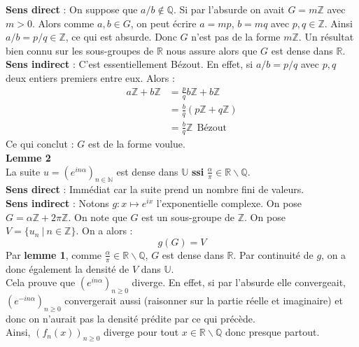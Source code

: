 \documentclass[a4paper,12pt]{article}
\begin{document}
\textbf{Sens direct} : On suppose que $a/b \notin \mathbb{Q}$. Si par l'absurde on avait $G=m \mathbb{Z}$ avec $m>0$. Alors comme $a,b \in G$, on peut écrire $a=mp$, $b=mq$ avec $p, q \in \mathbb{Z}$. Ainsi $a/b=p/q \in \mathbb{Z}$, ce qui est absurde. Donc $G$ n'est pas de la forme $m \mathbb{Z}$. Un résultat bien connu sur les sous-groupes de $\mathbb{R}$ nous assure alors que $G$ est dense dans $\mathbb{R}$. \\

\textbf{Sens indirect} : C'est essentiellement Bézout. En effet, si $a/b=p/q$ avec $p, q$ deux entiers premiers entre eux. Alors :
\begin{align*}
a\mathbb{Z}+b \mathbb{Z} & = \frac{p}{q}b \mathbb{Z} + b \mathbb{Z} \\
	&= \frac{b}{q} (p \mathbb{Z} + q\mathbb{Z}) \\
	& \boxed{=\frac{b}{q} \mathbb{Z}} \ \ \text{Bézout}
\end{align*}
Ce qui conclut : $G$ est de la forme voulue. \\

\textbf{Lemme 2} \\
La suite $u=(e^{in\alpha})_{n \in \mathbb{N}}$ est dense dans $\mathbb{U}$ \textbf{ssi} $\frac{\alpha}{\pi} \in \mathbb{R} \backslash \mathbb{Q}$. \\

\textbf{Sens direct} : Immédiat car la suite prend un nombre fini de valeurs. \\

\textbf{Sens indirect} : Notons $g:x\mapsto e^{ix}$ l'exponentielle complexe. On pose $G = \alpha \mathbb{Z} + 2 \pi \mathbb{Z}$. On note que $G$ est un sous-groupe de $\mathbb{Z}$. On pose $V=\{ u_n \ | \ n \in \mathbb{Z} \}$. On a alors :
$$\boxed{g(G) = V}$$
Par \textbf{lemme 1}, comme $\frac{\alpha}{\pi} \in \mathbb{R} \backslash \mathbb{Q}$, $G$ est dense dans $\mathbb{R}$. Par continuité de $g$, on a donc également la densité de $V$ dans $\mathbb{U}$. \\

Cela prouve que $(e^{in \alpha})_{n \geq 0}$ diverge. En effet, si par l'absurde elle convergeait, $(e^{-in \alpha})_{n \geq 0}$ convergerait aussi (raisonner sur la partie réelle et imaginaire) et donc on n'aurait pas la densité prédite par ce qui précède. \\

Ainsi, $(f_n(x))_{n \geq 0}$ diverge pour tout $x \in \mathbb{R} \backslash \mathbb{Q}$ donc presque partout. \\
\end{document}
